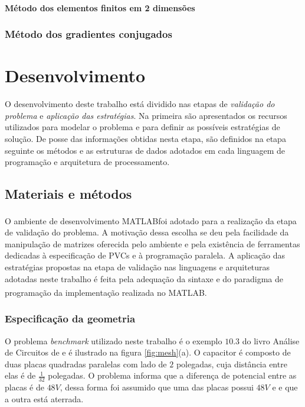 \documentclass[
    12pt,               %
    openright,          %
    oneside,
    a4paper,            %
    english,            %
    french,             %
    spanish,            %
    brazil              %
    ]{abntex2}
\newcommand{\matlab}{MATLAB\textsuperscript{\textregistered}}
\begin{document}
\subsubsection*{Método dos elementos finitos em 2 dimensões}
\label{sec:fem2d}

\subsection{Método dos gradientes conjugados}

\chapter{Desenvolvimento}

O desenvolvimento deste trabalho está  dividido nas etapas de \textit{validação do problema} e \textit{aplicação das estratégias}. Na primeira são apresentados os recursos utilizados para modelar o problema e para definir as possíveis estratégias de solução. De posse das informações obtidas nesta etapa, são definidos na etapa seguinte os métodos e as estruturas de dados adotados em cada linguagem de programação e arquitetura de processamento.

\section{Materiais e métodos}
O ambiente de desenvolvimento \matlab foi adotado para a realização da etapa de validação do problema. A motivação dessa escolha se deu pela facilidade da manipulação de matrizes oferecida pelo ambiente e pela existência de ferramentas dedicadas à especificação de PVCs e à programação paralela.
A aplicação das estratégias propostas na etapa de validação nas linguagens e arquiteturas adotadas neste trabalho é feita pela adequação da sintaxe e do paradigma de programação da implementação realizada no \matlab. 

\subsection{Especificação da geometria}
O problema \textit{benchmark} utilizado neste trabalho é o exemplo $10.3$ do livro Análise de Circuitos de  e é ilustrado na figura \ref{fig:mesh}{(a)}. O capacitor é composto de duas placas quadradas paralelas com lado de $2$ polegadas, cuja distância entre elas é de $\frac{1}{32}$ polegadas. O problema informa que a diferença de potencial entre as placas é de $48V$, dessa forma foi assumido que uma das placas possui $48V$ e e que a outra está aterrada.
\end{document}
